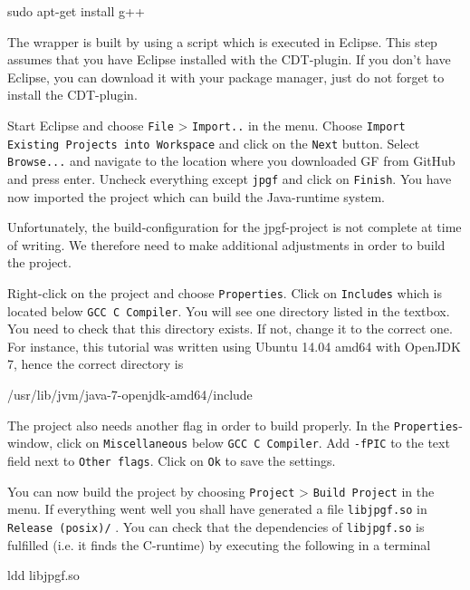 \begin{terminal}
sudo apt-get install g++
\end{terminal}

The wrapper is built by using a script which is executed in Eclipse. This step assumes that you have Eclipse installed with the CDT-plugin. If you don't have Eclipse, you can download it with your package manager, just do not forget to install the CDT-plugin.

Start Eclipse and choose \texttt{File} > \texttt{Import..} in the menu. Choose \texttt{Import Existing Projects into Workspace} and click on the \texttt{Next} button. Select \texttt{Browse...} and navigate to the location where you downloaded GF from GitHub and press enter. Uncheck everything except \texttt{jpgf} and click on \texttt{Finish}. You have now imported the project which can build the Java-runtime system. 

Unfortunately, the build-configuration for the jpgf-project is not complete at time of writing. We therefore need to make additional adjustments in order to build the project.

Right-click on the project and choose \texttt{Properties}. Click on \texttt{Includes} which is located below \texttt{GCC C Compiler}. You will see one directory listed in the textbox. You need to check that this directory exists. If not, change it to the correct one. For instance, this tutorial was written using Ubuntu 14.04 amd64 with OpenJDK 7, hence the correct directory is

\begin{terminal}
/usr/lib/jvm/java-7-openjdk-amd64/include
\end{terminal}

The project also needs another flag in order to build properly. In the \texttt{Properties}-window, click on \texttt{Miscellaneous} below \texttt{GCC C Compiler}. Add \texttt{-fPIC} to the text field next to \texttt{Other flags}. Click on \texttt{Ok} to save the settings.

You can now build the project by choosing \texttt{Project} > \texttt{Build Project} in the menu. If everything went well you shall have generated a file \texttt{libjpgf.so} in \texttt{Release (posix)/} . You can check that the dependencies of \texttt{libjpgf.so} is fulfilled (i.e. it finds the C-runtime) by executing the following in a terminal

\begin{terminal}
ldd libjpgf.so
\end{terminal}

